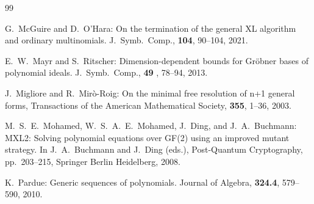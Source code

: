 \documentclass{article}
\theoremstyle{definition}
\theoremstyle{plain}
\theoremstyle{plain}
\theoremstyle{plain}
\theoremstyle{plain}
\numberwithin{equation}{subsection}
\begin{document}
\begin{thebibliography}{99}

G.\ McGuire and D.\ O'Hara:
On the termination of the general XL algorithm and ordinary multinomials.
J.\ Symb.\ Comp., {\bf 104}, 90--104, 2021.

E.\ W.\ Mayr and S.\ Ritscher:
Dimension-dependent bounds for Gr\"{o}bner bases of polynomial ideals.
J.\ Symb.\ Comp., {\bf 49} , 78--94, 2013.

J.\ Migliore and R.\ Mir\`o-Roig: On the minimal free resolution of n+1 general forms, 
Transactions of the American Mathematical Society, {\bf 355}, 1--36, 2003.

M.\ S.\ E.\ Mohamed, W.\ S.\ A.\ E.\ Mohamed, J.\ Ding, and
J.\ A.\ Buchmann:
MXL2: Solving polynomial equations over GF(2) using an improved mutant strategy.
In J.\ A.\ Buchmann and J.\ Ding (eds.), Post-Quantum Cryptography, pp.\ 203--215, Springer Berlin Heidelberg, 2008.




K.\ Pardue:
Generic sequences of polynomials.
Journal of Algebra, {\bf 324.4}, 579--590, 2010.




\end{thebibliography}
\end{document}
